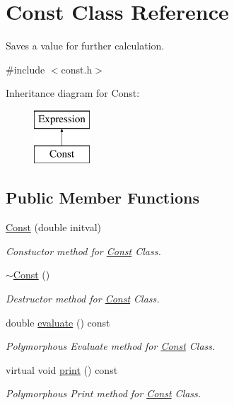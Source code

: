 \hypertarget{class_const}{}\section{Const Class Reference}
\label{class_const}


Saves a value for further calculation.  




{\ttfamily \#include $<$const.\+h$>$}

Inheritance diagram for Const\+:\begin{figure}[H]
\begin{center}
\leavevmode
\includegraphics[height=2.000000cm]{class_const}
\end{center}
\end{figure}
\subsection*{Public Member Functions}
\begin{DoxyCompactItemize}
\item 
\hyperlink{class_const_a0d12dfb3f9b2ada576ce78d4914227ad}{Const} (double initval)
\begin{DoxyCompactList}\small\item\em Constuctor method for \hyperlink{class_const}{Const} Class. \end{DoxyCompactList}\item 
\mbox{\label{class_const_a458fd0ff9671ebb6bba2e54247753126}} 
\hyperlink{class_const_a458fd0ff9671ebb6bba2e54247753126}{$\sim$\+Const} ()
\begin{DoxyCompactList}\small\item\em Destructor method for \hyperlink{class_const}{Const} Class. \end{DoxyCompactList}\item 
double \hyperlink{class_const_a2f86d9af4cbc9dda466815c66360ba16}{evaluate} () const
\begin{DoxyCompactList}\small\item\em Polymorphous Evaluate method for \hyperlink{class_const}{Const} Class. \end{DoxyCompactList}\item 
\mbox{\label{class_const_a81dc57c45d716e31d1cdb65a2c8f227d}} 
virtual void \hyperlink{class_const_a81dc57c45d716e31d1cdb65a2c8f227d}{print} () const
\begin{DoxyCompactList}\small\item\em Polymorphous Print method for \hyperlink{class_const}{Const} Class. \end{DoxyCompactList}\end{DoxyCompactItemize}



